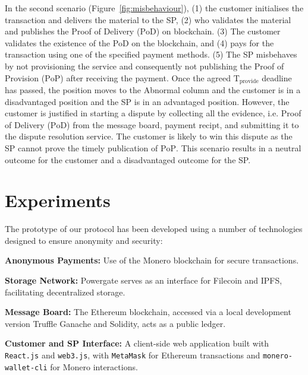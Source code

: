 \documentclass[pdftex,twocolumn,epjc3]{svjour3}
\begin{document}
In the second scenario (Figure~\ref{fig:misbehaviour}), (1) the customer initialises the transaction and delivers the material to the SP, (2) who validates the material and publishes the Proof of Delivery ($\mathrm{PoD}$) on blockchain. (3) The customer validates the existence of the PoD on the blockchain, and (4) pays for the transaction using one of the specified payment methods. (5) The SP misbehaves by not provisioning the service and consequently not publishing the Proof of Provision ($\mathrm{PoP}$) after receiving the payment. Once the agreed $\mathrm{T}_\mathrm{provide}$ deadline has passed, the position moves to the Abnormal column and the customer is in a disadvantaged position and the SP is in an advantaged position. However, the customer is justified in starting a dispute by collecting all the evidence, i.e. Proof of Delivery ($\mathrm{PoD}$) from the message board, payment $\mathrm{recipt}$, and submitting it to the dispute resolution service. The customer is likely to win this dispute as the SP cannot prove the timely publication of $\mathrm{PoP}$. This scenario results in a neutral outcome for the customer and a disadvantaged outcome for the SP.


\section{Experiments}\label{sec:experiments}

The prototype of our protocol has been developed using a number of technologies designed to ensure anonymity and security:
\begin{itemize}
\begin{sloppypar}
  \item \textbf{Anonymous Payments:} Use of the Monero blockchain for secure transactions.
\end{sloppypar}
  \item \textbf{Storage Network:} Powergate serves as an interface for Filecoin and IPFS, facilitating decentralized storage.
  \item \textbf{Message Board:} The Ethereum blockchain, accessed via a local development version Truffle Ganache and Solidity, acts as a public ledger.
  \item \textbf{Customer and SP Interface:} A client-side web application built with \texttt{React.js} and \texttt{web3.js}, with \texttt{MetaMask} for Ethereum transactions and \texttt{monero-wallet-cli} for Monero interactions.
\end{itemize}
\end{document}
